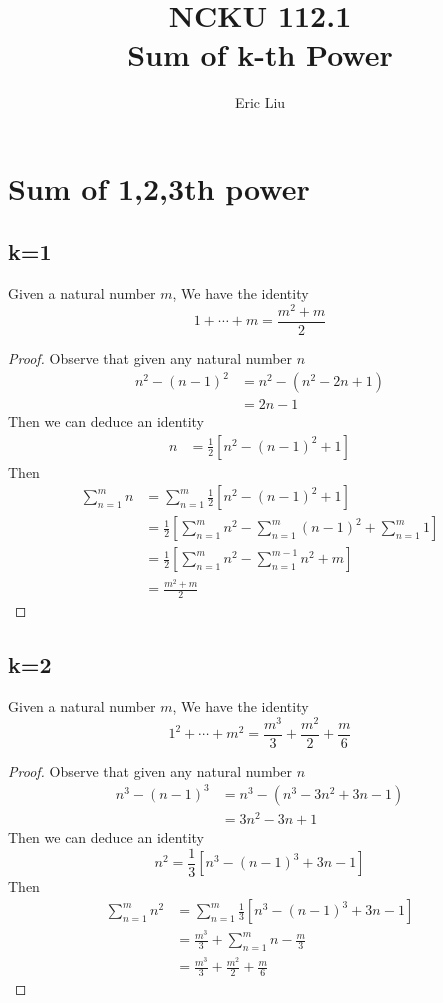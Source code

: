 \documentclass{report}
\title{\Huge{NCKU 112.1}\\Sum of k-th Power}
\author{\huge{Eric Liu}}
\date{}
\begin{document}
\maketitle
\newpage%
\tableofcontents
\pagebreak
\chapter{Sum of 1,2,3th power}
\section{k=1}
\begin{theorem}
  Given a natural number $m$, We have the identity 
\begin{equation}
1+\cdots +m=\frac{m^2+m}{2}
\end{equation} 
\end{theorem} 
\begin{proof}
Observe that given any natural number $n$
\begin{align}
  n^2-( n-1 ) ^2 &= n^2-( n^2-2n+1 ) \\ &= 2n-1
\end{align} 
Then we can deduce an identity
\begin{align}
  n&=\frac{1}{2}[ n^2-( n-1 ) ^2+1 ]  
\end{align} 
Then
\begin{align}
  \sum_{n=1}^{m} n &= \sum_{n=1}^{m}\frac{1}{2}[n^2-( n-1 ) ^2+1] \\&= \frac{1}{2}[\sum_{n=1}^{m} n^2-\sum_{n=1}^{m}(n-1)^2+\sum_{n=1}^{m}1] \\&=\frac{1}{2}[ \sum_{n=1}^{m} n^2- \sum_{n=1}^{m-1} n^2+m ] \\&= \frac{m^2+m}{2}
\end{align} 
\end{proof} 
\section{k=2}%
\label{sec:power to 2}
\begin{theorem}
  Given a natural number $m$, We have the identity 
\begin{equation}
 1^2+\cdots +m^2= \frac{m^3}{3}+\frac{m^2}{2}+\frac{m}{6}
\end{equation} 
\end{theorem} 
\begin{proof}
Observe that given any natural number $n$
\begin{align}
  n^3-( n-1 ) ^3&=n^3-( n^3-3n^2+3n-1 ) \\&= 3n^2-3n+1
\end{align} 
Then we can deduce an identity
\begin{equation}
n^2=\frac{1}{3}[ n^3-( n-1 ) ^3+3n-1 ] 
\end{equation} 
Then 
\begin{align}
  \sum_{n=1}^{m} n^2&=\sum_{n=1}^{m}\frac{1}{3}[  n^3-( n-1 ) ^3+3n-1 ]\\&= \frac{m^3}{3}+\sum_{n=1}^{m} n-\frac{m}{3}               \\&=\frac{m^3}{3}+\frac{m^2}{2}+\frac{m}{6}
\end{align} 
\end{proof} 
\end{document}
